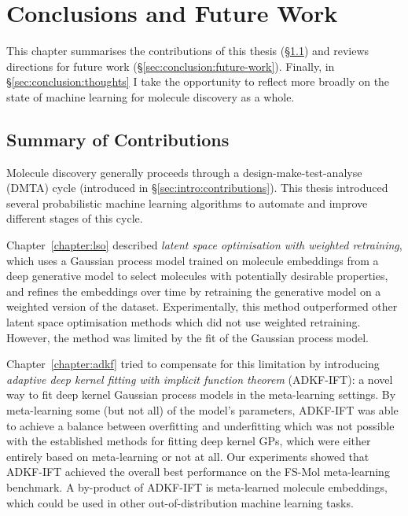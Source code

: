 \chapter{Conclusions and Future Work}
\label{chapter:conclusion}

This chapter summarises the contributions of this thesis
(\S\ref{sec:conclusion:contributions})
and reviews directions for future work
(\S\ref{sec:conclusion:future-work}).
Finally, in \S\ref{sec:conclusion:thoughts}
I take the opportunity to reflect more broadly
on the state of machine learning for molecule discovery
as a whole.

\section{Summary of Contributions}
\label{sec:conclusion:contributions}

Molecule discovery generally proceeds through a design-make-test-analyse (DMTA) cycle
(introduced in \S\ref{sec:intro:contributions}).
This thesis introduced several probabilistic machine learning algorithms
to automate and improve different stages of this cycle.

Chapter~\ref{chapter:lso} described
\emph{latent space optimisation with weighted retraining},
which uses a Gaussian process model trained on molecule embeddings
from a deep generative model to select molecules with potentially desirable properties,
and refines the embeddings over time by retraining the generative model
on a weighted version of the dataset.
Experimentally, this method outperformed other latent space optimisation methods
which did not use weighted retraining.
However, the method was limited by the fit of the Gaussian process model.

Chapter~\ref{chapter:adkf} tried to compensate for this limitation
by introducing \emph{adaptive deep kernel fitting with implicit function theorem} (ADKF-IFT):
a novel way to fit deep kernel Gaussian process models in the meta-learning settings.
By meta-learning some (but not all) of the model's parameters,
ADKF-IFT was able to achieve a balance between overfitting and underfitting
which was not possible with the established methods for fitting deep kernel GPs,
which were either entirely based on meta-learning or not at all.
Our experiments showed that ADKF-IFT achieved the overall best performance
on the FS-Mol meta-learning benchmark.
A by-product of ADKF-IFT is meta-learned molecule embeddings,
which could be used in other out-of-distribution machine learning tasks.

